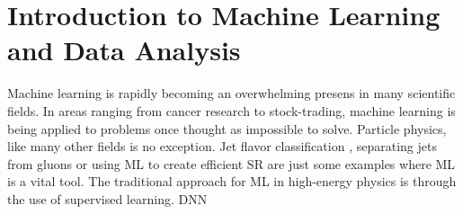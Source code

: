 \chapter{Introduction to Machine Learning and Data Analysis}\label{chap:Intro ML}
Machine learning is rapidly becoming an overwhelming presens in many scientific fields.
In areas ranging from cancer research to stock-trading, machine learning is being applied to problems
once thought as impossible to solve. Particle physics, like many other fields is no exception. Jet flavor classification \cite{Guest_2016}, 
separating jets from gluons \cite{PhysRevD.44.2025} or using \ac{ML} to create efficient \ac{SR} are just some examples
where \ac{ML} is a vital tool. The traditional approach for ML in high-energy physics is through the use 
of supervised learning. \ac{DNN}


